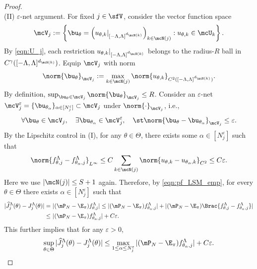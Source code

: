 \documentclass[11pt]{article}
\begin{document}
\begin{proof}
\ \\[-5pt]
\noindent
(II) $\varepsilon$-net argument.
%
For fixed $j \in \sfV$, consider the vector function space 
\[
    \mcV_j := \left\{ \bu_\theta = \left(u_{\theta,k}|_{[-\Lambda,\Lambda]^{d_{\mcN(k)}}}\right)_{k \in \mcN(j)}: u_{\theta,k} \in \mcU_k \right\}.
\]
By \eqref{eqn:U_j}, each restriction $u_{\theta,k}|_{[-\Lambda,\Lambda]^{d_{\mcN(k)}}}$ belongs to the radius-$R$ ball in $C^\gamma([-\Lambda,\Lambda]^{d_{\mcN(k)}})$.
%
Equip $\mcV_j$ with norm 
\[
    \norm{ \bu_\theta }_{\mcV_j} := \max_{k\in \mcN(j)} \norm{ u_{\theta,k} }_{C^2([-\Lambda,\Lambda]^{d_{\mcN(k)}})}.
\]
By definition, $\sup_{\bu_\theta \in \mcV_j} \norm{\bu_\theta}_{\mcV_j} \le R$.
%
Consider an $\varepsilon$-net $\mcV_j^\varepsilon = \{ \bu_{\theta_\alpha} \}_{\alpha \in [N_j^\varepsilon]} \subset \mcV_j$ under $\norm{\cdot}_{\mcV_j}$, i.e.,
\[
    \forall \bu_\theta \in \mcV_j, \quad \exists \bu_{\theta_\alpha} \in \mcV_j^\varepsilon, \quad \st\norm{ \bu_\theta - \bu_{\theta_\alpha} }_{\mcV_j} \le \varepsilon.
\]
By the Lipschitz control in (I), for any $\theta \in \Theta$, there exists some $\alpha \in [N_j^\varepsilon]$ such that
\[
    \norm{ f_{\theta,j}^\Lambda - f_{\theta_\alpha,j}^\Lambda }_{L^\infty} \le C \sum_{k\in \mcN(j)} \norm{ u_{\theta,k} - u_{\theta_\alpha,k} }_{C^2} \le C\varepsilon.
\]
Here we use $|\mcN(j)| \le S + 1$ again.
Therefore, by \eqref{eqn:pf_LSM_emp}, for every $\theta \in \Theta$ there exists $\alpha \in [N_j^\varepsilon]$ such that
\begin{align*}
    | \widehat{J}_j^\Lambda(\theta) - J_j^\Lambda(\theta) | =~& | (\mP_N - \E_\pi) f_{\theta,j}^\Lambda | \le | (\mP_N - \E_\pi) f_{\theta_\alpha,j}^\Lambda | + | (\mP_N - \E_\pi)\Brac{ f_{\theta,j}^\Lambda - f_{\theta_\alpha,j}^\Lambda } | \\
    \le~& | (\mP_N - \E_\pi) f_{\theta_\alpha,j}^\Lambda | + C\varepsilon.
\end{align*}
This further implies that for any $\varepsilon >0$,
\begin{equation}
\label{eqn:pf_LSM_eps_bound}
    \sup_{\theta \in \Theta} | \widehat{J}_j^\Lambda(\theta) - J_j^\Lambda(\theta) | \le \max_{1\le \alpha \le N_j^\varepsilon} | (\mP_N - \E_\pi) f_{\theta_\alpha,j}^\Lambda | + C\varepsilon.
\end{equation}



\end{proof}
\end{document}
